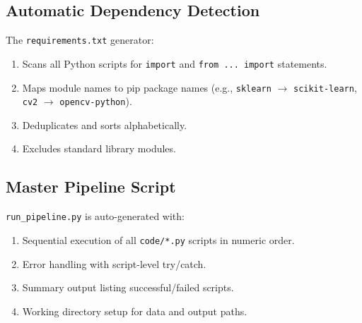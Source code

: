 \subsection{Automatic Dependency Detection}

The \texttt{requirements.txt} generator:
\begin{enumerate}
  \item Scans all Python scripts for \texttt{import} and \texttt{from ... import} statements.
  \item Maps module names to pip package names (e.g., \texttt{sklearn} $\to$ \texttt{scikit-learn}, \texttt{cv2} $\to$ \texttt{opencv-python}).
  \item Deduplicates and sorts alphabetically.
  \item Excludes standard library modules.
\end{enumerate}

\subsection{Master Pipeline Script}

\texttt{run\_pipeline.py} is auto-generated with:
\begin{enumerate}
  \item Sequential execution of all \texttt{code/*.py} scripts in numeric order.
  \item Error handling with script-level try/catch.
  \item Summary output listing successful/failed scripts.
  \item Working directory setup for data and output paths.
\end{enumerate}
